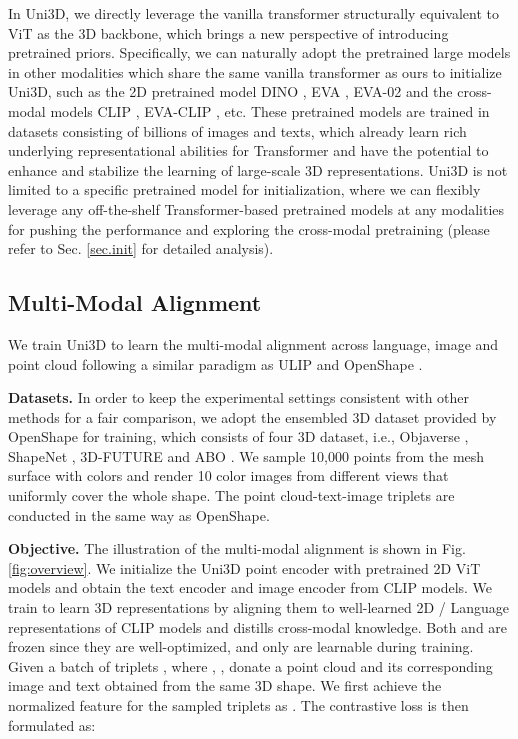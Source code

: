 \documentclass{article} \usepackage{iclr2024_conference,times}
\def\Ours{Uni3D\xspace}
\begin{document}
In \Ours, we directly leverage the vanilla transformer structurally equivalent to ViT as the 3D backbone, which brings a new perspective of introducing pretrained priors. Specifically, we can naturally adopt the pretrained large models in other modalities which share the same vanilla transformer as ours to initialize \Ours, such as the 2D pretrained model DINO \citep{caron2021emerging}, EVA \citep{fang2023eva}, EVA-02 \citep{fang2023eva02} and the cross-modal models CLIP \citep{radford2021learning}, EVA-CLIP \citep{sun2023eva}, etc. These pretrained models are trained in datasets consisting of billions of images and texts, which already learn rich underlying representational abilities for Transformer and have the potential to enhance and stabilize the learning of large-scale 3D representations. 
\Ours is not limited to a specific pretrained model for initialization, where we can flexibly leverage any off-the-shelf Transformer-based pretrained models at any modalities for pushing the performance and exploring the cross-modal pretraining (please refer to Sec. \ref{sec.init} for detailed analysis).

\subsection{Multi-Modal Alignment}
\label{sec.m2}

We train \Ours to learn the multi-modal alignment across language, image and point cloud following a similar paradigm as ULIP \citep{xue2023ulip} and OpenShape \citep{liu2023openshape}. 

\textbf{Datasets.} In order to keep the experimental settings consistent with other methods for a fair comparison, we adopt the ensembled 3D dataset provided by OpenShape for training, which consists of four 3D dataset, i.e., Objaverse \citep{deitke2023objaverse}, ShapeNet \citep{chang2015shapenet}, 3D-FUTURE \citep{fu20213d} and ABO \citep{collins2022abo}. We sample 10,000 points from the mesh surface with colors and render 10 color images from different views that uniformly cover the whole shape. The point cloud-text-image triplets are conducted in the same way as OpenShape.

\textbf{Objective.} The illustration of the multi-modal alignment is shown in Fig. \ref{fig:overview}. We initialize the \Ours point encoder  with pretrained 2D ViT models and obtain the text encoder  and image encoder  from CLIP models. We train  to learn 3D representations by aligning them to well-learned 2D / Language representations of CLIP models and distills cross-modal knowledge. Both  and  are frozen since they are well-optimized, and only  are learnable during training. Given a batch of  triplets , where ,  ,  donate a point cloud and its corresponding image and text obtained from the same 3D shape. We first achieve the normalized feature for the sampled triplets as . The contrastive loss is then formulated as:
\end{document}
